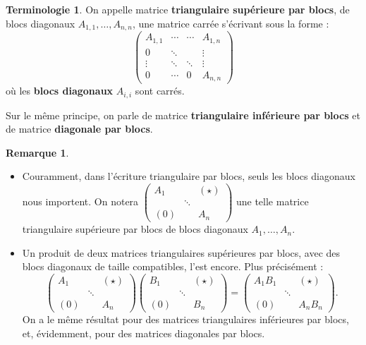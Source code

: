 \documentclass[french]{article}
\theoremstyle{plain}
\theoremstyle{definition}
\newtheorem*{rmq}{Remarque}
\newtheorem*{terminologie}{Terminologie}
\theoremstyle{remark}
\begin{document}
\begin{terminologie}
	On appelle matrice \textbf{triangulaire supérieure par blocs}, de blocs diagonaux $A_{1,1},\ldots,A_{n,n}$, une matrice carrée s'écrivant sous la forme :
	$$\begin{pmatrix}
		A_{1,1}&\cdots&\cdots&A_{1,n}\\
		0&\ddots&&\vdots\\
		\vdots&\ddots&\ddots&\vdots\\
		0&\cdots&0&A_{n,n}
	\end{pmatrix}$$ où les \textbf{blocs diagonaux} $A_{i,i}$ sont carrés.
	
	Sur le même principe, on parle de matrice \textbf{triangulaire inférieure par blocs} et de matrice \textbf{diagonale par blocs}.
\end{terminologie}

\begin{rmq}
	\begin{itemize}
		\item Couramment, dans l'écriture triangulaire par blocs, seuls les blocs diagonaux nous importent. On notera $\begin{pmatrix}
			A_1&&(\star)\\
			&\ddots&\\
			(0)&&A_n
		\end{pmatrix}$ une telle matrice triangulaire supérieure par blocs de blocs diagonaux $A_1,\ldots,A_n$.
		\item Un produit de deux matrices triangulaires supérieures par blocs, avec des blocs diagonaux de taille compatibles, l'est encore. Plus précisément :
		$$\begin{pmatrix}
			A_1&&(\star)\\
			&\ddots&\\
			(0)&&A_n
		\end{pmatrix}\begin{pmatrix}
		B_1&&(\star)\\
		&\ddots&\\
		(0)&&B_n
		\end{pmatrix}=\begin{pmatrix}
		A_1B_1&&(\star)\\
		&\ddots&\\
		(0)&&A_nB_n
		\end{pmatrix}.$$
		On a le même résultat pour des matrices triangulaires inférieures par blocs, et, évidemment, pour des matrices diagonales par blocs.
	\end{itemize}
\end{rmq}
\end{document}
